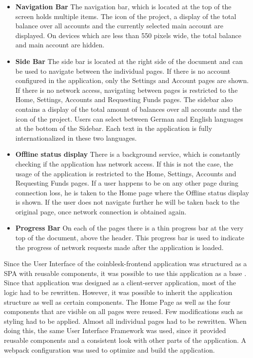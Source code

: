 \begin{itemize}
\item \textbf{Navigation Bar}
The navigation bar, which is located at the top of the screen holds multiple items. The icon of the project, a display of the total balance over all accounts and the currently selected main account are displayed. 
On devices which are less than 550 pixels wide, the total balance and main account are hidden.
\item \textbf{Side Bar}
The side bar is located at the right side of the document and can be used to navigate between the individual pages. If there is no account configured in the application, only the Settings and Account pages are shown. If there is no network access, navigating between pages is restricted to the Home, Settings, Accounts and Requesting Funds pages.
The sidebar also contains a display of the total amount of balances over all accounts and the icon of the project. Users can select between German and English languages at the bottom of the Sidebar. Each text in the application is fully internationalized in these two languages.


\item \textbf{Offline status display}
There is a background service, which is constantly checking if the application has network access. If this is not the case, the usage of the application is restricted to the Home, Settings, Accounts and Requesting Funds pages. If a user happens to be on any other page during connection loss, he is taken to the Home page where the Offline status display is shown. If the user does not navigate further he will be taken back to the original page, once network connection is obtained again.
\item \textbf{Progress Bar}
On each of the pages there is a thin progress bar at the very top of the document, above the header. This progress bar is used to indicate the progress of network requests made after the application is loaded.

\end{itemize}

Since the User Interface of the coinblesk-frontend application was structured as a SPA with reusable components, it was possible to use this application as a base \cite{coinbleskfrontend}. Since that application was designed as a client-server application, most of the logic had to be rewritten. However, it was possible to inherit the application structure as well as certain components. The Home Page as well as the four components that are visible on all pages were reused. Few modifications such as styling had to be applied. Almost all individual pages had to be rewritten. When doing this, the same User Interface Framework was used, since it provided reusable components and a consistent look with other parts of the application. A webpack configuration was used to optimize and build the application.

